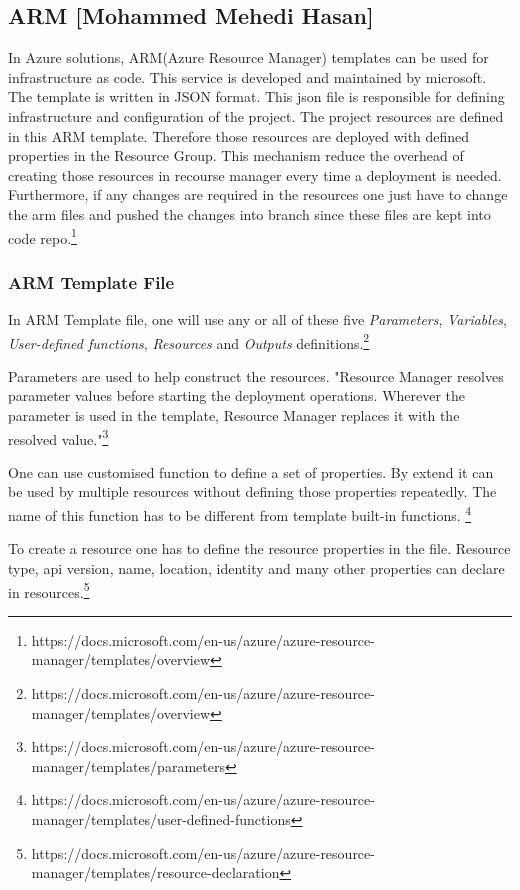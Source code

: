 \subsection{ARM [Mohammed Mehedi Hasan]}

In Azure solutions, ARM(Azure Resource Manager) templates can be used for infrastructure as code. This service is developed and maintained by microsoft. The template is written in JSON format. This json file is responsible for defining infrastructure and configuration of the project. The project resources are defined in this ARM template. Therefore those resources are deployed with defined properties in the Resource Group. This mechanism reduce the overhead of creating those resources in recourse manager every time a deployment is needed. Furthermore, if any changes are required in the resources one just have to change the arm files and pushed the changes into branch since these files are kept into code repo.\footnote{https://docs.microsoft.com/en-us/azure/azure-resource-manager/templates/overview}

\subsubsection{ARM Template File}

In ARM Template file, one will use any or all of these five \textit{Parameters}, \textit{Variables}, \textit{User-defined functions}, \textit{Resources} and \textit{Outputs} definitions.\footnote{https://docs.microsoft.com/en-us/azure/azure-resource-manager/templates/overview}

Parameters are used to help construct the resources. "Resource Manager resolves parameter values before starting the deployment operations. Wherever the parameter is used in the template, Resource Manager replaces it with the resolved value."\footnote{https://docs.microsoft.com/en-us/azure/azure-resource-manager/templates/parameters}

One can use customised function to define a set of properties. By extend it can be used by multiple resources without defining those properties repeatedly. The name of this function has to be different from template built-in functions. \footnote{https://docs.microsoft.com/en-us/azure/azure-resource-manager/templates/user-defined-functions}

To create a resource one has to define the resource properties in the file. Resource type, api version, name, location, identity and many other properties can declare in resources.\footnote{https://docs.microsoft.com/en-us/azure/azure-resource-manager/templates/resource-declaration}

